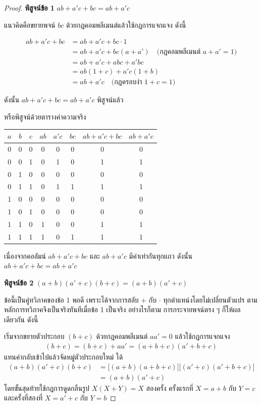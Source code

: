 \begin{proof}
\textbf{พิสูจน์ข้อ 1} $a b + a' c + b c = a b + a' c$

แนวคิดคือขยายพจน์ $bc$ ด้วยกฎคอมพลีเมนต์แล้วใช้กฎการแจกแจง ดังนี้

\begin{align*}
a b + a' c + b c &= a b + a' c + b c \cdot 1 \\
                &= a b + a' c + b c (a + a') \quad \text{(กฎคอมพลีเมนต์ } a + a' = 1 \text{)} \\
                &= a b + a' c + a b c + a' b c \\
                &= a b(1 + c) + a' c(1 + b) \\
                &= a b + a' c \quad \text{(กฎครอบงำ } 1 + c = 1 \text{)}
\end{align*}

ดังนั้น $a b + a' c + b c = a b + a' c$ พิสูจน์แล้ว

หรือพิสูจน์ด้วยตารางค่าความจริง

\begin{center}
\begin{tabular}{|c|c|c|c|c|c|c|c|}
\hline
$a$ & $b$ & $c$ & $ab$ & $a'c$ & $bc$ & $ab+a'c+bc$ & $ab+a'c$ \\
\hline
0 & 0 & 0 & 0 & 0 & 0 & 0 & 0 \\
\hline
0 & 0 & 1 & 0 & 1 & 0 & 1 & 1 \\
\hline
0 & 1 & 0 & 0 & 0 & 0 & 0 & 0 \\
\hline
0 & 1 & 1 & 0 & 1 & 1 & 1 & 1 \\
\hline
1 & 0 & 0 & 0 & 0 & 0 & 0 & 0 \\
\hline
1 & 0 & 1 & 0 & 0 & 0 & 0 & 0 \\
\hline
1 & 1 & 0 & 1 & 0 & 0 & 1 & 1 \\
\hline
1 & 1 & 1 & 1 & 0 & 1 & 1 & 1 \\
\hline
\end{tabular}
\end{center}

เนื่องจากคอลัมน์ $ab + a'c + bc$ และ $ab + a'c$ มีค่าเท่ากันทุกแถว ดังนั้น $a b + a' c + b c = a b + a' c$

\medskip
\textbf{พิสูจน์ข้อ 2} $(a + b)(a' + c)(b + c) = (a + b)(a' + c)$

ข้อนี้เป็นคู่ทวิภาคของข้อ 1 พอดี เพราะได้จากการสลับ $+$ กับ $\cdot$ ทุกตำแหน่งโดยไม่เปลี่ยนตัวแปร ตามหลักการทวิภาคจึงเป็นจริงทันทีเมื่อข้อ 1 เป็นจริง อย่างไรก็ตาม การกระจายพจน์ตรง ๆ ก็ให้ผลเดียวกัน ดังนี้

เริ่มจากขยายตัวประกอบ $(b + c)$ ด้วยกฎคอมพลีเมนต์ $a a' = 0$ แล้วใช้กฎการแจกแจง
\begin{align*}
(b + c) = (b + c) + a a' = (a + b + c)(a' + b + c)
\end{align*}
แทนค่ากลับเข้าไปแล้วจัดหมู่ตัวประกอบใหม่ ได้
\begin{align*}
(a + b)(a' + c)(b + c) &= \bigl[(a + b)(a + b + c)\bigr]\bigl[(a' + c)(a' + b + c)\bigr]\\
                       &= (a + b)(a' + c)
\end{align*}
โดยขั้นสุดท้ายใช้กฎการดูดกลืนรูป $X(X + Y) = X$ สองครั้ง ครั้งแรกที่ $X = a + b$ กับ $Y = c$ และครั้งที่สองที่ $X = a' + c$ กับ $Y = b$


\end{proof}
